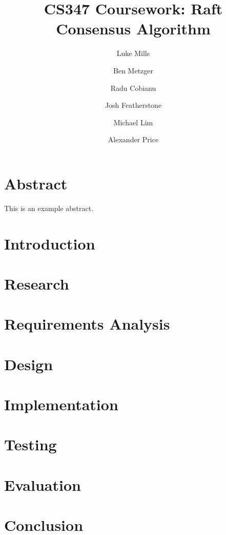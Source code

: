 \documentclass{article}
\title{CS347 Coursework: Raft Consensus Algorithm}
\author{Luke Mills \and Ben Metzger \and Radu Cobianu \and Josh Featherstone \and Michael Lim \and Alexander Price}
\begin{document}
\maketitle

\section{Abstract}

This is an example abstract.

\section{Introduction}

\section{Research}

\section{Requirements Analysis}

\section{Design}

\section{Implementation}

\section{Testing}

\section{Evaluation}

\section{Conclusion}



\end{document}
